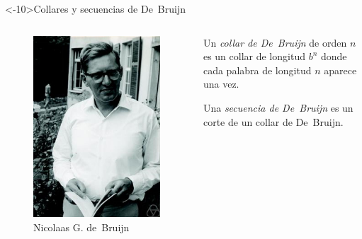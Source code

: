\documentclass[spanish,xcolor={table}]{beamer}
\begin{document}
\begin{frame}<-10>{Collares y secuencias de De~Bruijn}

\begin{columns}
  \begin{figure}
    \includegraphics[width=\textwidth]{de-bruijn.jpg}
    \caption{Nicolaas G. de~Bruijn}
  \end{figure}

  \begin{definition}
    Un \emph{collar de De~Bruijn} de orden $n$ es un collar de longitud
    $b^n$ donde cada palabra de longitud $n$ aparece una vez.

    \medskip

    Una \emph{secuencia de De~Bruijn} es un corte de un collar de De~Bruijn.
  \end{definition}
  

\end{columns}
\end{frame}
\end{document}
